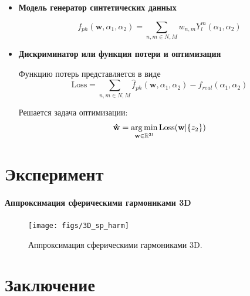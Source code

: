 \documentclass[12pt,twoside]{article}
\begin{document}
\begin{itemize}
\item \textbf{Модель генератор синтетических данных}

\begin{equation}
	f_{ph}(\mathbf{w},\alpha_1,\alpha_2) = \sum_{n,m \in N,M} w_{n,m}Y_l^m(\alpha_1,\alpha_2)
\label{eq:f_ph_3d}
\end{equation}
\vspace{\baselineskip}

\item \textbf{Дискриминатор или функция потери и оптимизация}

Функцию потерь представляется в виде
\begin{equation}
\textrm{Loss} =  \sum_{n,m \in N,M} \hat{f}_{ph}(\mathbf{w},\alpha_1,\alpha_2) - f_{real}(\alpha_{1},\alpha_2)
\label{eq:L_3d}
\end{equation}

Решается задача оптимизации:
\begin{equation}
\mathbf{\hat{w}} = \argmin_{\mathbf{w} \in \mathbb{R}^{2l}} \textrm{Loss}(\mathbf{w}|\{z_{2}\})
\label{eq:arg_l}
\end{equation}
\end{itemize}


\section{Эксперимент}

\paragraph{Аппроксимация сферическими гармониками 3D}

\begin{figure}[h]
\centering
\texttt{[image: figs/3D\_sp\_harm]}
\caption{Аппроксимация сферическими гармониками 3D. }
\label{fg:3D_sp_harm}
\end{figure}

\section{Заключение}
\newpage

\end{document}
